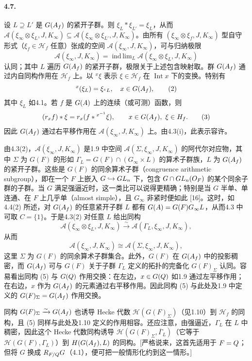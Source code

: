 \paragraph*{4.7.}
设 $L\supseteq L'$ 是 $G(A_f)$ 的紧开子群。则 $\xi_L*\xi_{L'}=\xi_L$，从而 $\mathcal A(\xi_\infty\otimes\xi_L,J,K_\infty)\subseteq\mathcal A(\xi_\infty\otimes\xi_{L'},J,K_\infty)$。由所有 $(\xi_\infty\otimes\xi_f,J,K_\infty)$ 型自守形式（$\xi_f\in\mathcal H_f$ 任意）张成的空间 $\mathcal A(\xi_\infty,J,K_\infty)$，可与归纳极限
\[
\mathcal A(\xi_\infty,J,K_\infty)=\mathop{\mathrm{ind\,lim}}_L\mathcal A(\xi_\infty\otimes\xi_L,J,K_\infty)\tag{1}
\]
认同；其中 $L$ 遍历 $G(A_f)$ 的紧开子群，极限关于上述包含映射取。群 $G(A_f)$ 通过内自同构作用在 $\mathcal H_f$ 上。以 ${}^x\xi$ 表示 $\xi\in\mathcal H_f$ 在 $\operatorname{Int}x$ 下的变换。特别有
\[
{}^x(\xi_L)=\xi_{{}^xL},\quad x\in G(A_f),\tag{2}
\]
其中 $\xi_L$ 如4.1。若 $f$ 是 $G(A)$ 上的连续（或可测）函数，则
\[
(r_xf)*\xi=r_x(f*{}^{x^{-1}}\xi),\qquad x\in G(A_f),\ \xi\in H_f.\tag{3}
\]
因此 $G(A_f)$ 通过右平移作用在 $\mathcal A(\xi_\infty,J,K_\infty)$ 上。由4.3(i)，此表示容许。

由4.3(2)，$\mathcal A(\xi_\infty,J,K_\infty)$ 是1.9 中空间 $\mathcal A(\Sigma,\xi_\infty,J,K_\infty)$ 的阿代尔对应物，其中 $\Sigma$ 为 $G(F)$ 的形如 $\Gamma_L=G(F)\cap(G_\infty\times L)$ 的算术子群族，$L$ 为 $G(A_f)$ 的紧开子群。这些是 $G(F)$ 的同余算术子群（congruence arithmetic subgroup），即在一个 $F$ 上嵌入 $G\hookrightarrow GL_n$ 下，包含 $G\cap GL_n(O_F)$ 的某个同余子群的子群。当 $G$ 满足强逼近时，这一类比可以说得更精确；特别是当 $G$ 半单、单连通、在 $F$ 上几乎单（almost simple），且 $G_\infty$ 非紧时便如此 [16]。这时，如4.4(2) 所述，对 $G(A_f)$ 的任意紧开子群 $L$ 都有 $G(A)=G(F)G_\infty L$，从而4.3 中可取 $C=\{1\}$。于是4.3(2) 对任意 $L$ 给出同构
\[
\mathcal A(\xi_\infty\otimes\xi_L,J,K_\infty)\xrightarrow{\sim}\mathcal A(\Gamma_L,\xi_\infty,J,K_\infty),\tag{4}
\]
从而
\[
\mathcal A(\xi_\infty,J,K_\infty)\cong\mathcal A(\Sigma,\xi_\infty,J,K_\infty),\tag{5}
\]
这里 $\Sigma$ 为 $G(F)$ 的同余算术子群集合。此外，$G(F)$ 在 $G(A_f)$ 中的投影稠密，而 $G(A_f)$ 可与 $G(F)$ 关于子群 $\Gamma_L$ 定义的拓扑的完备化 $G(F)_\Sigma$ 认同。容易看出同构 (5) 与 $G(Q)$ 作用交换：在左边，$x\in G(Q)$ 如1.9 通过左平移作用；在右边，$x$ 作为 $G(A_f)$ 的元素通过右平移作用。因此同构 (5) 与此处及1.9 中定义的 $G(F)_\Sigma=G(A_f)$ 作用交换。

同构 $G(F)_\Sigma\xrightarrow{\sim}G(A_f)$ 也诱导 Hecke 代数 $\mathcal H(G(F)_\Sigma)$（见1.10）到 $\mathcal H_f$ 的同构，且 (5) 同样与此处及1.10 定义的作用相容。还应注意，由强逼近，$\Gamma_L$ 在 $L$ 中稠密，因此这个 Hecke 代数同构诱导 $\mathcal H(G(F)_\Sigma,\overline\Gamma_L)$（它等于 $\mathcal H(G(F),\Gamma_L)$）到 $H(G(A_f),L)$ 的同构。[严格说来，这首先适用于 $F=Q$；但将 $G$ 换成 $R_{F/Q}G$（4.1），便可把一般情形化约到这一情形。]

